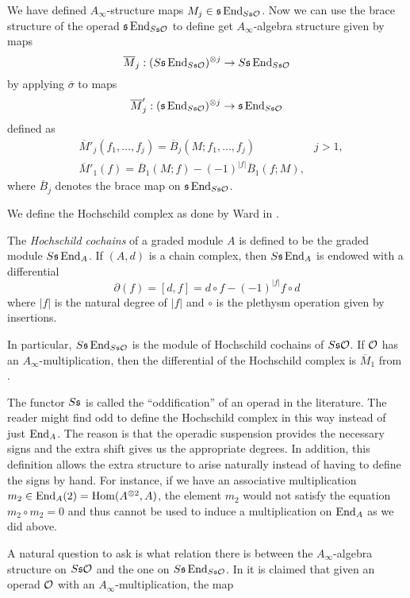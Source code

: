 \documentclass[Thesis.tex]{subfiles}
\begin{document}
We have defined $A_\infty$-structure maps $M_j\in\mathfrak{s}\operatorname{End}_{S\mathfrak{s}{\mathcal O}}$. Now we can use the brace structure of the operad $\mathfrak{s}\operatorname{End}_{S\mathfrak{s}{\mathcal O}}$ to define get $A_\infty$-algebra structure given by maps
\begin{equation}\label{barmaps}
\overline{M}_j:(S\mathfrak{s}\operatorname{End}_{S\mathfrak{s}{\mathcal O}})^{\otimes j}\to S\mathfrak{s}\operatorname{End}_{S\mathfrak{s}{\mathcal O}}
\end{equation}
by applying $\overline{\sigma}$ to maps
\[\overline{M}'_j:(\mathfrak{s}\operatorname{End}_{S\mathfrak{s}{\mathcal O}})^{\otimes j}\to \mathfrak{s}\operatorname{End}_{S\mathfrak{s}{\mathcal O}}\]
defined as
\begin{align*}
&\overline{M}'_j(f_1,\dots,f_j)=\overline{B}_j(M;f_1,\dots, f_j) & j>1,\\
&\overline{M}'_1(f)=\overline{B}_1(M;f)-(-1)^{|f|}\overline{B}_1(f;M),
\end{align*}
where $\overline{B}_j$ denotes the brace map on $\mathfrak{s}\operatorname{End}_{S\mathfrak{s}{\mathcal O}}$.

We define the Hochschild complex as done by Ward in \cite{ward}.
\begin{defin}
The \emph{Hochschild cochains} of a graded module $A$ is defined to be the graded module $S\mathfrak{s}\operatorname{End}_A$. If  $(A,d)$ is a chain complex, then $S\mathfrak{s}\operatorname{End}_A$ is endowed with a differential \[\partial(f)=[d,f]=d\circ f -(-1)^{|f|}f\circ d\] where $|f|$ is the natural degree of $|f|$ and $\circ$ is the plethysm operation given by insertions.
\end{defin}
In particular, $S\mathfrak{s}\operatorname{End}_{S\mathfrak{s}{\mathcal O}}$ is the module of Hochschild cochains of $S\mathfrak{s}{\mathcal O}$. If ${\mathcal O}$ has an $A_\infty$-multiplication, then the differential of the Hochschild complex is $\overline{M}_1$ from .
\begin{remark}
The functor $S\mathfrak{s}$ is called the ``oddification'' of an operad in the literature. %
The reader might find odd to define the Hochschild complex in this way instead of just $\operatorname{End}_A$. The reason is that the operadic suspension provides the necessary signs and the extra shift gives us the appropriate degrees. In addition, this definition allows the extra structure to arise naturally instead of having to define the signs by hand. For instance, if we have an associative multiplication $m_2\in\operatorname{End}_A(2)=\operatorname{Hom}(A^{\otimes 2},A)$, the element $m_2$ would not satisfy the equation $m_2\circ m_2=0$ and thus cannot be used to induce a multiplication on $\operatorname{End}_A$ as we did above.
\end{remark}

 A natural question to ask is what relation there is between the $A_\infty$-algebra structure on $S\mathfrak{s}{\mathcal O}$ and the one on $S\mathfrak{s}\operatorname{End}_{S\mathfrak{s}{\mathcal O}}$. In \cite{GV} it is claimed that given an operad ${\mathcal O}$ with an $A_\infty$-multiplication, the map
\end{document}
